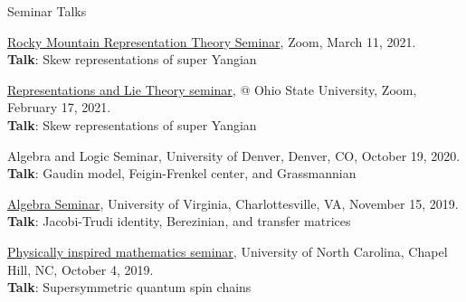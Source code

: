 \documentclass{resume} %
\begin{document}
\begin{rSection}{Seminar Talks}
\begin{rSubsection}{}{}
{}{}
  \item {\href{https://sites.google.com/view/rockymountainreptheory/home}{Rocky Mountain Representation Theory Seminar}, Zoom, March 11, 2021.\\
        {\bf Talk}: Skew representations of super Yangian}\\
  \item {\href{https://research.math.osu.edu/reps/}{Representations and Lie Theory seminar}, @ Ohio State University, Zoom, February 17, 2021.\\
        {\bf Talk}: Skew representations of super Yangian}\\
  \item {Algebra and Logic Seminar, University of Denver, Denver, CO, October 19, 2020. \\
		{\bf Talk}:  Gaudin model, Feigin-Frenkel center, and Grassmannian}\\
  \item {\href{https://math.virginia.edu/seminars/algebra/2019-20/}{Algebra Seminar}, University of Virginia, Charlottesville, VA, November 15, 2019. \\
		{\bf Talk}:  Jacobi-Trudi identity, Berezinian, and transfer matrices}\\
  \item {\href{https://math.virginia.edu/seminars/algebra/2019-20/}{Physically inspired mathematics seminar}, University of North Carolina, Chapel Hill, NC, October 4, 2019. \\
		{\bf Talk}: Supersymmetric quantum spin chains}\\
\end{rSubsection}
\end{rSection}
\end{document}
